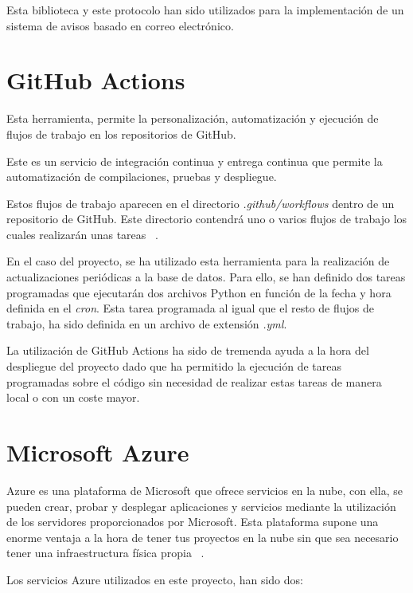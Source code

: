 Esta biblioteca y este protocolo han sido utilizados para la implementación de un sistema de avisos basado en correo electrónico.

\section{GitHub Actions}
Esta herramienta, permite la personalización, automatización y ejecución de flujos de trabajo en los repositorios de GitHub.

Este es un servicio de integración continua y entrega continua que permite la automatización de compilaciones, pruebas y despliegue.

Estos flujos de trabajo aparecen en el directorio \textit{.github/workflows} dentro de un repositorio de GitHub. Este directorio contendrá uno o varios flujos de trabajo los cuales realizarán unas tareas ~\cite{githubactions:latex}.

En el caso del proyecto, se ha utilizado esta herramienta para la realización de actualizaciones periódicas a la base de datos. Para ello, se han definido dos tareas programadas que ejecutarán dos archivos Python en función de la fecha y hora definida en el \textit{cron}. Esta tarea programada al igual que el resto de flujos de trabajo, ha sido definida en un archivo de extensión \textit{.yml}.

La utilización de GitHub Actions ha sido de tremenda ayuda a la hora del despliegue del proyecto dado que ha permitido la ejecución de tareas programadas sobre el código sin necesidad de realizar estas tareas de manera local o con un coste mayor.

\section{Microsoft Azure}

Azure es una plataforma de Microsoft que ofrece servicios en la nube, con ella, se pueden crear, probar y desplegar aplicaciones y servicios mediante la utilización de los servidores proporcionados por Microsoft. Esta plataforma supone una enorme ventaja a la hora de tener tus proyectos en la nube sin que sea necesario tener una infraestructura física propia ~\cite{azure:latex}.

Los servicios Azure utilizados en este proyecto, han sido dos:

